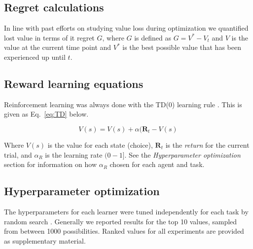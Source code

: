 \subsection*{Regret calculations}
In line with past efforts on studying value loss during optimization we quantified lost value in terms of it regret $G$, where $G$ is defined as $G = V^* - V_t$ and $V$ is the value at the current time point and $V^*$ is the best possible value that has been experienced up until $t$.

\subsection*{Reward learning equations} Reinforcement learning was always done with the TD(0) learning rule \cite{Sutton2018}. This is given as Eq.~\ref{eq:TD} below. 

\begin{equation}
	\label{eq:TD}
	V(s) = V(s) + \alpha (\mathbf{R}_t - V(s)
\end{equation}

Where $V(s)$ is the value for each state (choice), $\mathbf{R}_t$ is the \emph{return} for the current trial, and $\alpha_R$ is the learning rate $(0-1]$. See the \emph{Hyperparameter optimization} section for information on how $\alpha_R$ chosen for each agent and task.

\subsection*{Hyperparameter optimization}
The hyperparameters for each learner were tuned independently for each task by random search \cite{Bergstra2012}. Generally we reported results for the top 10 values, sampled from between 1000 possibilities. Ranked values for all experiments are provided as supplementary material.


